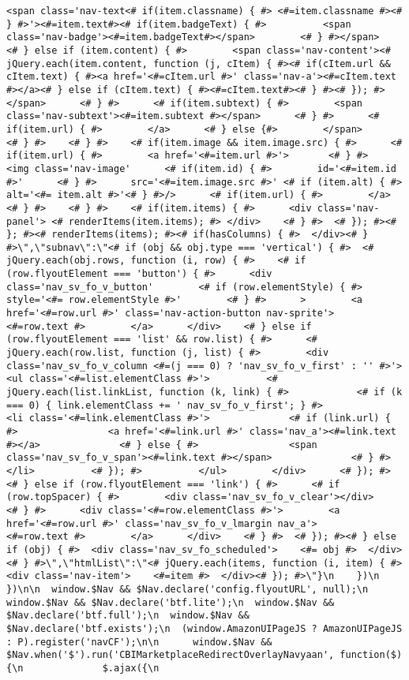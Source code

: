 \documentclass[
]{article}
\begin{document}
\begin{verbatim}
<span class='nav-text<# if(item.classname) { #> <#=item.classname #><# } #>'><#=item.text#><# if(item.badgeText) { #>          <span class='nav-badge'><#=item.badgeText#></span>        <# } #></span>      <# } else if (item.content) { #>        <span class='nav-content'><# jQuery.each(item.content, function (j, cItem) { #><# if(cItem.url && cItem.text) { #><a href='<#=cItem.url #>' class='nav-a'><#=cItem.text #></a><# } else if (cItem.text) { #><#=cItem.text#><# } #><# }); #></span>      <# } #>      <# if(item.subtext) { #>        <span class='nav-subtext'><#=item.subtext #></span>      <# } #>      <# if(item.url) { #>        </a>      <# } else {#>        </span>      <# } #>    <# } #>    <# if(item.image && item.image.src) { #>      <# if(item.url) { #>        <a href='<#=item.url #>'>       <# } #>      <img class='nav-image'      <# if(item.id) { #>        id='<#=item.id #>'      <# } #>      src='<#=item.image.src #>' <# if (item.alt) { #> alt='<#= item.alt #>'<# } #>/>      <# if(item.url) { #>        </a>       <# } #>    <# } #>    <# if(item.items) { #>      <div class='nav-panel'> <# renderItems(item.items); #> </div>    <# } #>  <# }); #><# }; #><# renderItems(items); #><# if(hasColumns) { #>  </div><# } #>\",\"subnav\":\"<# if (obj && obj.type === 'vertical') { #>  <# jQuery.each(obj.rows, function (i, row) { #>    <# if (row.flyoutElement === 'button') { #>      <div class='nav_sv_fo_v_button'        <# if (row.elementStyle) { #>          style='<#= row.elementStyle #>'        <# } #>      >        <a href='<#=row.url #>' class='nav-action-button nav-sprite'>          <#=row.text #>        </a>      </div>    <# } else if (row.flyoutElement === 'list' && row.list) { #>      <# jQuery.each(row.list, function (j, list) { #>        <div class='nav_sv_fo_v_column <#=(j === 0) ? 'nav_sv_fo_v_first' : '' #>'>          <ul class='<#=list.elementClass #>'>          <# jQuery.each(list.linkList, function (k, link) { #>            <# if (k === 0) { link.elementClass += ' nav_sv_fo_v_first'; } #>            <li class='<#=link.elementClass #>'>              <# if (link.url) { #>                <a href='<#=link.url #>' class='nav_a'><#=link.text #></a>              <# } else { #>                <span class='nav_sv_fo_v_span'><#=link.text #></span>              <# } #>            </li>          <# }); #>          </ul>        </div>      <# }); #>    <# } else if (row.flyoutElement === 'link') { #>      <# if (row.topSpacer) { #>        <div class='nav_sv_fo_v_clear'></div>      <# } #>      <div class='<#=row.elementClass #>'>        <a href='<#=row.url #>' class='nav_sv_fo_v_lmargin nav_a'>          <#=row.text #>        </a>      </div>    <# } #>  <# }); #><# } else if (obj) { #>  <div class='nav_sv_fo_scheduled'>    <#= obj #>  </div><# } #>\",\"htmlList\":\"<# jQuery.each(items, function (i, item) { #>  <div class='nav-item'>    <#=item #>  </div><# }); #>\"}\n    })\n  })\n\n  window.$Nav && $Nav.declare('config.flyoutURL', null);\n  window.$Nav && $Nav.declare('btf.lite');\n  window.$Nav && $Nav.declare('btf.full');\n  window.$Nav && $Nav.declare('btf.exists');\n  (window.AmazonUIPageJS ? AmazonUIPageJS : P).register('navCF');\n\n      window.$Nav && $Nav.when('$').run('CBIMarketplaceRedirectOverlayNavyaan', function($) {\n              $.ajax({\n  
\end{verbatim}
\end{document}
